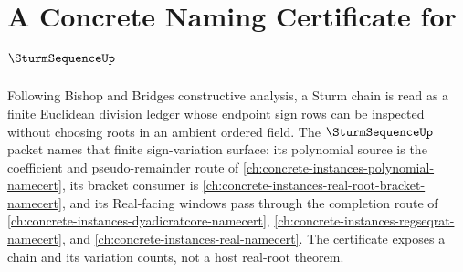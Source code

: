 \chapter{A Concrete Naming Certificate for $\SturmSequenceUp$}
\label{ch:concrete-instances-sturm-sequence-namecert}

Following Bishop and Bridges constructive analysis, a Sturm chain is read as a finite Euclidean division ledger whose endpoint sign rows can be inspected without choosing roots in an ambient ordered field. The $\SturmSequenceUp$ packet names that finite sign-variation surface: its polynomial source is the coefficient and pseudo-remainder route of \autoref{ch:concrete-instances-polynomial-namecert}, its bracket consumer is \autoref{ch:concrete-instances-real-root-bracket-namecert}, and its Real-facing windows pass through the completion route of \autoref{ch:concrete-instances-dyadicratcore-namecert}, \autoref{ch:concrete-instances-regseqrat-namecert}, and \autoref{ch:concrete-instances-real-namecert}. The certificate exposes a chain and its variation counts, not a host real-root theorem.

